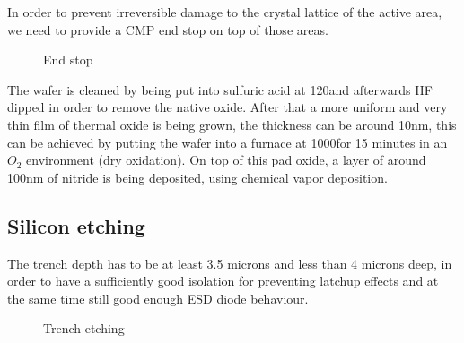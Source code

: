 In order to prevent irreversible damage to the crystal lattice of the active area, we need to provide a CMP end stop on top of those areas.

\begin{figure}[H]
	\centering
	\begin{tikzpicture}[node distance = 3cm, auto, thick,scale=\CrossSectionOnly, every node/.style={transform shape}]
		
	\end{tikzpicture}
	\drawStepArrow{}
	\begin{tikzpicture}[node distance = 3cm, auto, thick,scale=\CrossSectionOnly, every node/.style={transform shape}]
		
	\end{tikzpicture}
	\caption{End stop}
\end{figure}

The wafer is cleaned by being put into sulfuric acid at 120\degreesC and afterwards HF dipped in order to remove the native oxide.
After that a more uniform and very thin film of thermal oxide is being grown, the thickness can be around 10nm, this can be achieved by putting the wafer into a furnace at 1000\degreesC for 15 minutes in an $O_2$ environment (dry oxidation).
On top of this pad oxide, a layer of around 100nm of nitride is being deposited, using chemical vapor deposition.

\subsection{Silicon etching}\label{sti_trench_etch}

The trench depth has to be at least 3.5 microns and less than 4 microns deep, in order to have a sufficiently good isolation for preventing latchup effects and at the same time still good enough ESD diode behaviour.

\begin{figure}[H]
	\centering
	\begin{tikzpicture}[node distance = 3cm, auto, thick,scale=\CrossSectionOnly, every node/.style={transform shape}]
		
	\end{tikzpicture}
	\drawStepArrow{}
	\begin{tikzpicture}[node distance = 3cm, auto, thick,scale=\CrossSectionOnly, every node/.style={transform shape}]
		
	\end{tikzpicture}
	\caption{Trench etching}
\end{figure}

